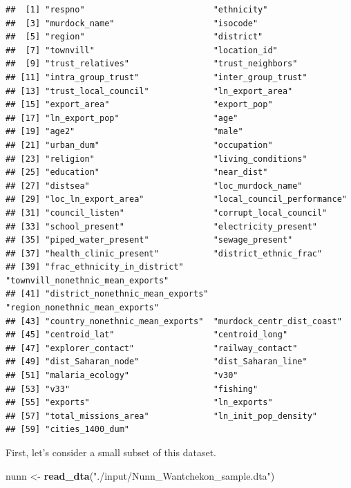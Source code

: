 \documentclass[]{book}
\newenvironment{Shaded}{\begin{snugshade}}{\end{snugshade}}
\newcommand{\KeywordTok}[1]{\textcolor[rgb]{0.13,0.29,0.53}{\textbf{#1}}}
\newcommand{\NormalTok}[1]{#1}
\newcommand{\StringTok}[1]{\textcolor[rgb]{0.31,0.60,0.02}{#1}}
\theoremstyle{definition}
\theoremstyle{definition}
\theoremstyle{definition}
\theoremstyle{remark}
\begin{document}
\begin{verbatim}
##  [1] "respno"                          "ethnicity"                      
##  [3] "murdock_name"                    "isocode"                        
##  [5] "region"                          "district"                       
##  [7] "townvill"                        "location_id"                    
##  [9] "trust_relatives"                 "trust_neighbors"                
## [11] "intra_group_trust"               "inter_group_trust"              
## [13] "trust_local_council"             "ln_export_area"                 
## [15] "export_area"                     "export_pop"                     
## [17] "ln_export_pop"                   "age"                            
## [19] "age2"                            "male"                           
## [21] "urban_dum"                       "occupation"                     
## [23] "religion"                        "living_conditions"              
## [25] "education"                       "near_dist"                      
## [27] "distsea"                         "loc_murdock_name"               
## [29] "loc_ln_export_area"              "local_council_performance"      
## [31] "council_listen"                  "corrupt_local_council"          
## [33] "school_present"                  "electricity_present"            
## [35] "piped_water_present"             "sewage_present"                 
## [37] "health_clinic_present"           "district_ethnic_frac"           
## [39] "frac_ethnicity_in_district"      "townvill_nonethnic_mean_exports"
## [41] "district_nonethnic_mean_exports" "region_nonethnic_mean_exports"  
## [43] "country_nonethnic_mean_exports"  "murdock_centr_dist_coast"       
## [45] "centroid_lat"                    "centroid_long"                  
## [47] "explorer_contact"                "railway_contact"                
## [49] "dist_Saharan_node"               "dist_Saharan_line"              
## [51] "malaria_ecology"                 "v30"                            
## [53] "v33"                             "fishing"                        
## [55] "exports"                         "ln_exports"                     
## [57] "total_missions_area"             "ln_init_pop_density"            
## [59] "cities_1400_dum"
\end{verbatim}

First, let's consider a small subset of this dataset.

\begin{Shaded}
\begin{Highlighting}[]
\NormalTok{nunn <-}\StringTok{ }\KeywordTok{read_dta}\NormalTok{(}\StringTok{"./input/Nunn_Wantchekon_sample.dta"}\NormalTok{)}
\end{Highlighting}
\end{Shaded}
\end{document}
